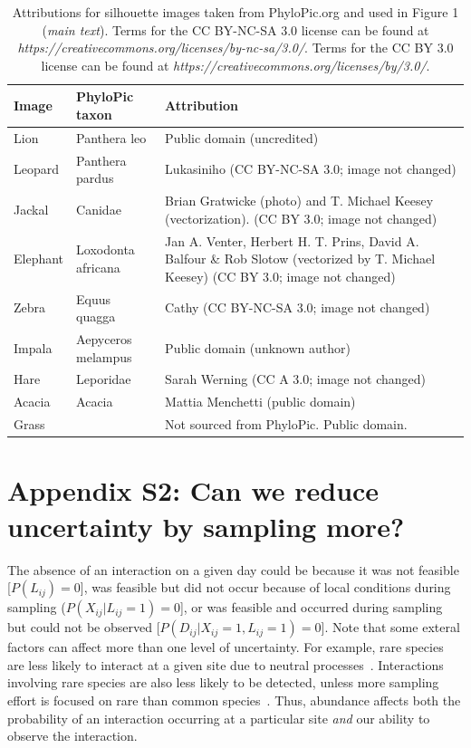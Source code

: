\documentclass[12pt]{article}
\begin{document}
  \begin{table}
  \caption{Attributions for silhouette images taken from PhyloPic.org and used in Figure 1 (\emph{main text}). Terms for the CC BY-NC-SA 3.0 license can be found at \emph{https://creativecommons.org/licenses/by-nc-sa/3.0/}. Terms for the CC BY 3.0 license can be found at \emph{https://creativecommons.org/licenses/by/3.0/}.}
  \begin{tabular}{l|l m{10cm}}
  Image & PhyloPic taxon & Attribution \\
  \hline
  Lion & Panthera leo & Public domain (uncredited) \\
  Leopard & Panthera pardus & Lukasiniho (CC BY-NC-SA 3.0; image not changed) \\
  Jackal & Canidae & Brian Gratwicke (photo) and T. Michael Keesey (vectorization). (CC BY 3.0; image not changed) \\
  Elephant & Loxodonta africana & Jan A. Venter, Herbert H. T. Prins, David A. Balfour \& Rob Slotow (vectorized by T. Michael Keesey) (CC BY 3.0; image not changed) \\
  Zebra & Equus quagga & Cathy (CC BY-NC-SA 3.0; image not changed) \\
  Impala & Aepyceros melampus & Public domain (unknown author) \\
  Hare & Leporidae & Sarah Werning (CC A 3.0; image not changed) \\
  Acacia & Acacia & Mattia Menchetti (public domain) \\
  Grass & & Not sourced from PhyloPic. Public domain. \\
  \hline
  \end{tabular}
  \end{table}

\clearpage

\section*{Appendix S2: Can we reduce uncertainty by sampling more?}

  
        The absence of an interaction on a given day could be because it was not feasible [$P(L_{ij}) = 0$], was feasible but did not occur because of local conditions during sampling ($P(X_{ij}|L_{ij} = 1) = 0$], or was feasible and occurred during sampling but could not be observed [$P(D_{ij}|X_{ij} = 1,L_{ij} = 1) = 0$]. Note that some exteral factors can affect more than one level of uncertainty. For example, rare species are less likely to interact at a given site due to neutral processes~\citep{Jordano2016,Graham2018}. Interactions involving rare species are also less likely to be detected, unless more sampling effort is focused on rare than common species~\citep{Bartomeus2013,Jordano2016}. Thus, abundance affects both the probability of an interaction occurring at a particular site \emph{and} our ability to observe the interaction. 
\end{document}
